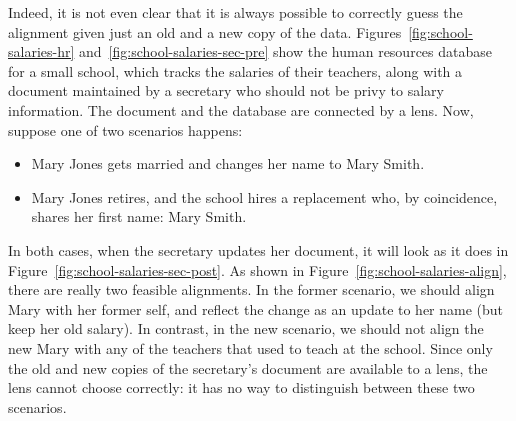 Indeed, it is not even clear that it is always possible to correctly guess
the alignment given just an old and a new copy of the data.
Figures~\ref{fig:school-salaries-hr} and~\ref{fig:school-salaries-sec-pre}
show the human resources database for a small school, which tracks the
salaries of their teachers, along with a document maintained by a secretary
who should not be privy to salary information. The document and the database
are connected by a \map lens. Now, suppose one of two scenarios happens:
\begin{itemize}
    \item Mary Jones gets married and changes her name to Mary Smith.
    \item Mary Jones retires, and the school hires a replacement who, by
        coincidence, shares her first name: Mary Smith.
\end{itemize}
In both cases, when the secretary updates her document, it will look as it
does in Figure~\ref{fig:school-salaries-sec-post}. As shown in
Figure~\ref{fig:school-salaries-align}, there are really two feasible
alignments. In the former scenario, we should align Mary with her former
self, and reflect the change as an update to her name (but keep her old
salary). In contrast, in the new scenario, we should not align the new Mary
with any of the teachers that used to teach at the school. Since only the
old and new copies of the secretary's document are available to a lens, the
lens cannot choose correctly: it has no way to distinguish between these two
scenarios.

